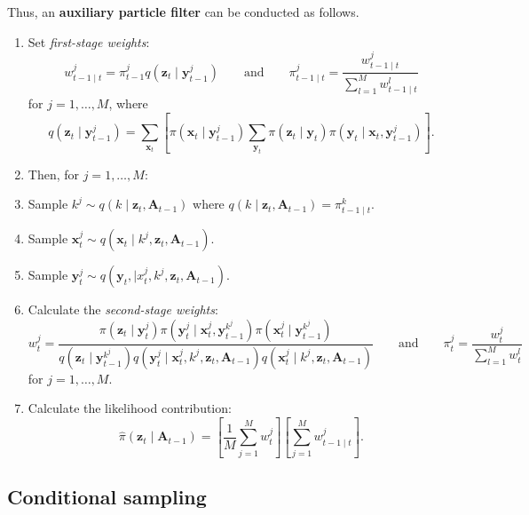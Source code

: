 \documentclass[a4paper]{article}
\newcommand{\bx}{\bm{x}}
\newcommand{\by}{\bm{y}}
\newcommand{\bz}{\bm{z}}
\newcommand{\bA}{\bm{A}}
\begin{document}
Thus, an \textbf{auxiliary particle filter} can be conducted as follows.
\begin{enumerate}
    \item Set \textit{first-stage weights}:
    $$
        w^j_{t - 1 \mid t} = \pi^j_{t - 1} q\left(\bz_t \mid \by^j_{t - 1}\right) \qquad \mbox{and} \qquad \pi^j_{t - 1 \mid t} = \frac{w^j_{t - 1 \mid t}}{\sum_{l = 1}^M w^l_{t - 1 \mid t}}
    $$ 
    for $j = 1, \dots, M$, where
    $$
        q\left(\bz_t \mid \by^j_{t - 1}\right) = \sum_{\bx_t} \left[\pi\left(\bx_t \mid \by^j_{t - 1}\right)\sum_{\by_t} \pi\left(\bz_t \mid \by_t\right)\pi\left(\by_t \mid \bx_t, \by^j_{t - 1}\right)\right].
    $$
    \item Then, for $j = 1, \dots, M$:
    \item Sample $k^j \sim q\left(k \mid \bz_t, \bA_{t - 1}\right)$ where $q\left(k \mid \bz_t, \bA_{t - 1}\right) = \pi^k_{t - 1 \mid t}$.\label{apf:k}
    \item Sample $\bx^j_t \sim q\left(\bx_t \mid k^j, \bz_t, \bA_{t - 1}\right)$.\label{apf:x}
    \item Sample $\by^j_t \sim q\left(\by_t, \mid x^j_t, k^j, \bz_t, \bA_{t - 1}\right)$.\label{apf:y}
    \item Calculate the \textit{second-stage weights}:
    $$
        w^j_t = \frac{\pi\left(\bz_t \mid \by^j_t\right)\pi\left(\by^j_t \mid \bx^j_t, \by^{k^j}_{t - 1}\right)\pi\left(\bx^j_t \mid \by^{k^j}_{t - 1}\right)}{q\left(\bz_t \mid \by^{k^j}_{t - 1}\right)q\left(\by^j_t \mid \bx^j_t, k^j, \bz_t, \bA_{t - 1}\right)q\left(\bx^j_t \mid k^j, \bz_t, \bA_{t - 1}\right)} \qquad \mbox{and} \qquad \pi^j_t = \frac{w^j_t}{\sum_{l = 1}^M w^l_t}
    $$ 
    for $j = 1, \dots, M$.
    \item Calculate the likelihood contribution:
    $$
        \hat{\pi}\left(\bz_t \mid \bA_{t - 1}\right) = \left[\frac{1}{M}\sum_{j = 1}^M w^j_t\right]\left[\sum_{j = 1}^M w^j_{t - 1 \mid t}\right].
    $$
\end{enumerate}

\subsection{Conditional sampling}
\end{document}
